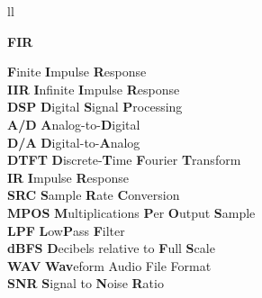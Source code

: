 \documentclass[
11pt, %
english, %
singlespacing, %
headsepline, %
]{MastersDoctoralThesis} %
\begin{document}

\tableofcontents %

\listoffigures %

\listoftables %


\begin{abbreviations}{ll} %

\hypertarget{FIR}{\textbf{FIR}}  \hfill  \textbf{F}inite \textbf{I}mpulse \textbf{R}esponse \\		
\hypertarget{IIR}{\textbf{IIR}}  \hfill  \textbf{I}nfinite \textbf{I}mpulse \textbf{R}esponse \\	
\hypertarget{DSP}{\textbf{DSP} \hfill \textbf{D}igital \textbf{S}ignal \textbf{P}rocessing}\\
\hypertarget{A/D}{\textbf{A/D} \hfill \textbf{A}nalog-to-\textbf{D}igital}\\
\hypertarget{D/A}{\textbf{D/A} \hfill \textbf{D}igital-to-\textbf{A}nalog}\\
\hypertarget{DTFT}{\textbf{DTFT}} \hfill \textbf{D}iscrete-\textbf{T}ime \textbf{F}ourier \textbf{T}ransform\\
\hypertarget{IR}{\textbf{IR}} \hfill \textbf{I}mpulse \textbf{R}esponse\\
\hypertarget{SRC}{\textbf{SRC}} \hfill \textbf{S}ample \textbf{R}ate \textbf{C}onversion \\	
\hypertarget{MPOS}{\textbf{MPOS}} \hfill \textbf{M}ultiplications \textbf{P}er \textbf{O}utput \textbf{S}ample \\	
\hypertarget{LPF}{\textbf{LPF}} \hfill \textbf{L}ow\textbf{P}ass \textbf{F}ilter\\
\hypertarget{dB FS}{\textbf{dBFS}} \hfill \textbf{D}ecibels relative to \textbf{F}ull \textbf{S}cale\\
\hypertarget{WAV}{\textbf{WAV}} \hfill \textbf{Wav}eform Audio File Format\\
\hypertarget{SNR}{\textbf{SNR}} \hfill \textbf{S}ignal to \textbf{N}oise \textbf{R}atio\\




\end{abbreviations}
\end{document}

